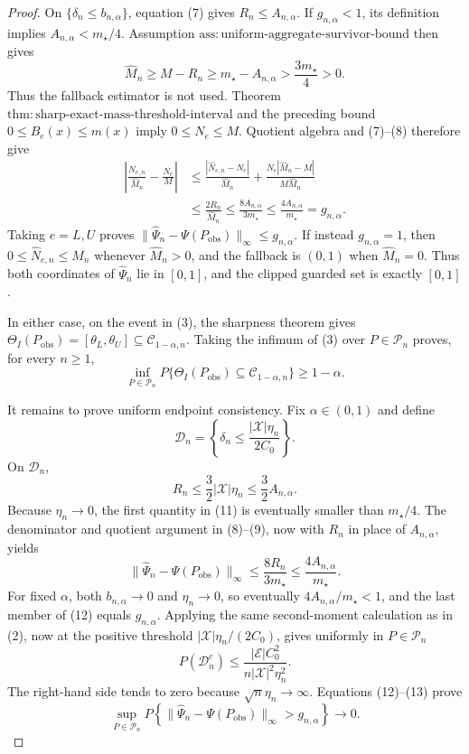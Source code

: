 \documentclass{article}
\begin{document}
\begin{proof}
On \(\{\delta_n\le b_{n,\alpha}\}\), equation (7) gives \(R_n\le A_{n,\alpha}\).  If \(g_{n,\alpha}<1\), its definition implies \(A_{n,\alpha}<m_{\star}/4\).  Assumption \(\mathrm{ass{:}uniform\text{-}aggregate\text{-}survivor\text{-}bound}\) then gives
\[
\widehat M_n\ge M-R_n
\ge m_{\star}-A_{n,\alpha}>\frac{3m_{\star}}4>0.
\tag{8}
\]
Thus the fallback estimator is not used.  Theorem \(\mathrm{thm{:}sharp\text{-}exact\text{-}mass\text{-}threshold\text{-}interval}\) and the preceding bound \(0\le B_e(x)\le m(x)\) imply \(0\le N_e\le M\).  Quotient algebra and (7)--(8) therefore give
\[
\begin{aligned}
\left|\frac{\widehat N_{e,n}}{\widehat M_n}-\frac{N_e}{M}\right|
&\le\frac{|\widehat N_{e,n}-N_e|}{\widehat M_n}
 +\frac{N_e|\widehat M_n-M|}{M\widehat M_n}\\
&\le\frac{2R_n}{\widehat M_n}
\le\frac{8A_{n,\alpha}}{3m_{\star}}
\le\frac{4A_{n,\alpha}}{m_{\star}}
=g_{n,\alpha}.
\end{aligned}
\tag{9}
\]
Taking \(e=L,U\) proves \(\|\widehat\Psi_n-\Psi(P_{\mathrm{obs}})\|_\infty\le g_{n,\alpha}\).  If instead \(g_{n,\alpha}=1\), then \(0\le\widehat N_{e,n}\le\widehat M_n\) whenever \(\widehat M_n>0\), and the fallback is \((0,1)\) when \(\widehat M_n=0\).  Thus both coordinates of \(\widehat\Psi_n\) lie in \([0,1]\), and the clipped guarded set is exactly \([0,1]\).

In either case, on the event in (3), the sharpness theorem gives \(\Theta_I(P_{\mathrm{obs}})=[\theta_L,\theta_U]\subseteq\mathcal C_{1-\alpha,n}\).  Taking the infimum of (3) over \(P\in\mathcal P_n\) proves, for every \(n\ge1\),
\[
\inf_{P\in\mathcal P_n}
P\{\Theta_I(P_{\mathrm{obs}})\subseteq\mathcal C_{1-\alpha,n}\}
\ge1-\alpha.
\tag{10}
\]

It remains to prove uniform endpoint consistency.  Fix \(\alpha\in(0,1)\) and define
\[
\mathcal D_n=\left\{\delta_n\le
\frac{|\mathcal X|\eta_n}{2C_0}\right\}.
\]
On \(\mathcal D_n\),
\[
R_n\le\frac32|\mathcal X|\eta_n
\le\frac32A_{n,\alpha}.
\tag{11}
\]
Because \(\eta_n\to0\), the first quantity in (11) is eventually smaller than \(m_{\star}/4\).  The denominator and quotient argument in (8)--(9), now with \(R_n\) in place of \(A_{n,\alpha}\), yields
\[
\|\widehat\Psi_n-\Psi(P_{\mathrm{obs}})\|_\infty
\le\frac{8R_n}{3m_{\star}}
\le\frac{4A_{n,\alpha}}{m_{\star}}.
\tag{12}
\]
For fixed \(\alpha\), both \(b_{n,\alpha}\to0\) and \(\eta_n\to0\), so eventually \(4A_{n,\alpha}/m_{\star}<1\), and the last member of (12) equals \(g_{n,\alpha}\).  Applying the same second-moment calculation as in (2), now at the positive threshold \(|\mathcal X|\eta_n/(2C_0)\), gives uniformly in \(P\in\mathcal P_n\)
\[
P(\mathcal D_n^c)
\le \frac{|\mathcal E|C_0^2}
{n|\mathcal X|^2\eta_n^2}.
\tag{13}
\]
The right-hand side tends to zero because \(\sqrt n\eta_n\to\infty\).  Equations (12)--(13) prove
\[
\sup_{P\in\mathcal P_n}
P\!\left\{\|\widehat\Psi_n-\Psi(P_{\mathrm{obs}})\|_\infty>g_{n,\alpha}\right\}
\longrightarrow0.
\tag{14}
\]


\end{proof}
\end{document}
